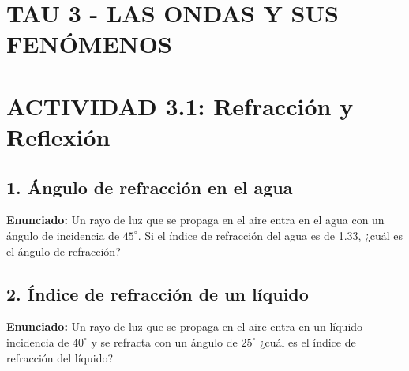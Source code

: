 \documentclass[12pt, letterpaper]{article}
\begin{document}
\section*{TAU 3 - LAS ONDAS Y SUS FENÓMENOS}

\section*{ACTIVIDAD 3.1: Refracción y Reflexión}

\subsection*{1. Ángulo de refracción en el agua}
\noindent \textbf{Enunciado:} Un rayo de luz que se propaga en el aire entra en el agua con un ángulo de incidencia de $45^{\circ}$. Si el índice de refracción del agua es de 1.33, ¿cuál es el ángulo de refracción?


\subsection*{2. Índice de refracción de un líquido}
\noindent \textbf{Enunciado:} Un rayo de luz que se propaga en el aire entra en un líquido incidencia de $40^{\circ}$ y se refracta con un ángulo de $25^{\circ}$ ¿cuál es el índice de refracción del líquido?

\end{document}
